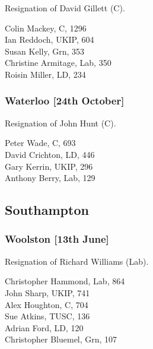\documentclass[a4paper,openany,10pt]{book}
\begin{document}
Resignation of David Gillett (C).



Colin Mackey, C, 1296\\
Ian Reddoch, UKIP, 604\\
Susan Kelly, Grn, 353\\
Christine Armitage, Lab, 350\\
Roisin Miller, LD, 234\\


\subsubsection*{Waterloo \hspace*{\fill}\nolinebreak[1]%
\enspace\hspace*{\fill}
[24th October]}


Resignation of John Hunt (C).



Peter Wade, C, 693\\
David Crichton, LD, 446\\
Gary Kerrin, UKIP, 296\\
Anthony Berry, Lab, 129\\


\subsection*{Southampton}

\subsubsection*{Woolston \hspace*{\fill}\nolinebreak[1]%
\enspace\hspace*{\fill}
[13th June]}


Resignation of Richard Williams (Lab).



{Christopher Hammond}, Lab, 864\\
John Sharp, UKIP, 741\\
Alex Houghton, C, 704\\
Sue Atkins, TUSC, 136\\
Adrian Ford, LD, 120\\
Christopher Bluemel, Grn, 107\\
\end{document}
